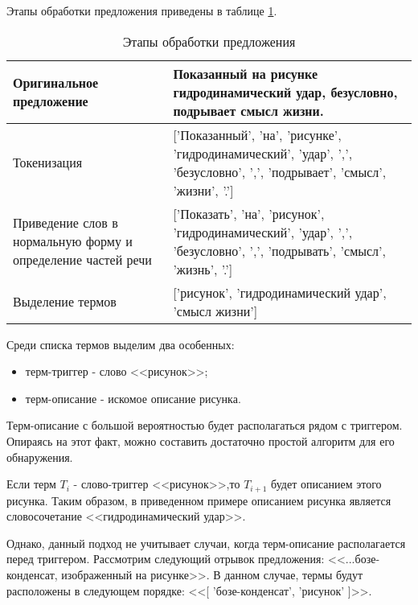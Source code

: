 Этапы обработки предложения приведены в таблице \ref{tab:parse-example-1}.

\noindent
\begin{table}[!ht]%
\caption{Этапы обработки предложения}\label{tab:parse-example-1}%
\begin{tabularx}{\textwidth} {
    | >{\small\hsize=0.35\hsize\raggedright\arraybackslash}X
    | >{\small\hsize=0.65\hsize\raggedright\arraybackslash}X | }
\hline
Оригинальное предложение & Показанный на рисунке
гидродинамический удар, безусловно, подрывает смысл жизни.\\

\hline

Токенизация & {[}'Показанный', 'на',
'рисунке', 'гидродинамический', 'удар', ',', 'безусловно', ',', 'подрывает',
'смысл', 'жизни', '.'{]} \\

\hline

Приведение слов в нормальную форму и определение частей речи & {[}'Показать',
'на', 'рисунок', 'гидродинамический', 'удар', ',', 'безусловно', ',',
'подрывать', 'смысл', 'жизнь', '.'{]} \\

\hline

Выделение термов & {[}'рисунок', 'гидродинамический удар', 'смысл жизни'{]} \\
\hline
\end{tabularx}
\end{table}

Среди списка термов выделим два особенных:

\begin{itemize}
    \item терм-триггер - слово <<рисунок>>;
    \item терм-описание - искомое описание рисунка.
\end{itemize}

Терм-описание с большой вероятностью будет располагаться рядом с триггером.
Опираясь на этот факт, можно составить достаточно простой алгоритм для его
обнаружения.

Если терм $T_i$ - слово-триггер <<рисунок>>,то $T_{i+1}$ будет описанием этого
рисунка. Таким образом, в приведенном примере описанием рисунка является
словосочетание <<гидродинамический удар>>.

Однако, данный подход не учитывает случаи, когда терм-описание располагается
перед триггером. Рассмотрим следующий отрывок предложения: <<...бозе-конденсат,
изображенный на рисунке>>. В данном случае, термы будут расположены в следующем
порядке: <<{[} 'бозе-конденсат', 'рисунок' {]}>>.

